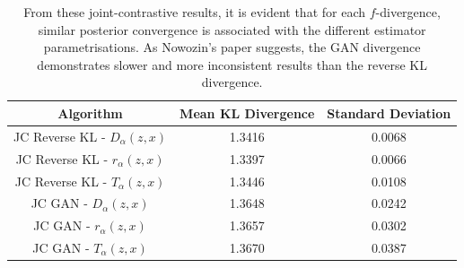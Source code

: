 \documentclass[honours,12pt]{unswthesis}
\numberwithin{equation}{section}
\theoremstyle{definition}
\begin{document}
\begin{table}[h!]
\centering
\begin{tabular}{|c|c|c|}
\hline
Algorithm & Mean KL Divergence & Standard Deviation\\
\hline
JC Reverse KL - $D_\alpha(z,x)$ & 1.3416 & 0.0068\\
\hline
JC Reverse KL - $r_\alpha(z,x)$ & 1.3397 & 0.0066\\
\hline
JC Reverse KL - $T_\alpha(z,x)$ & 1.3446 & 0.0108\\
\hline
JC GAN - $D_\alpha(z,x)$ & 1.3648 & 0.0242\\
\hline
JC GAN - $r_\alpha(z,x)$ & 1.3657 & 0.0302\\
\hline
JC GAN - $T_\alpha(z,x)$ & 1.3670 & 0.0387\\
\hline
\end{tabular}
\caption{\small From these joint-contrastive results, it is evident that for each $f$-divergence, similar posterior convergence is associated with the different estimator parametrisations. As Nowozin's paper suggests, the GAN divergence demonstrates slower and more inconsistent results than the reverse KL divergence.}
\label{tab:6.2}
\end{table}
\end{document}
